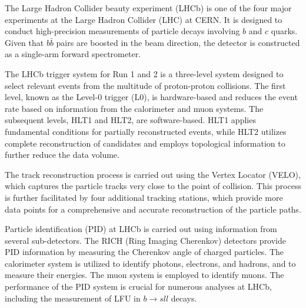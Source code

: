 The Large Hadron Collider beauty experiment (LHCb) is one of the four major experiments 
at the Large Hadron Collider (LHC) at CERN. It is designed to conduct high-precision 
measurements of particle decays involving $b$ and $c$ quarks. Given that $b\bar{b}$ pairs 
are boosted in the beam direction, the detector is constructed as a single-arm forward 
spectrometer. \cite{LHCb}

The LHCb trigger system for Run 1 and 2 is a three-level system designed to select relevant events from 
the multitude of proton-proton collisions. The first level, known as the Level-0 trigger 
(L0), is hardware-based and reduces the event rate based on information from the calorimeter 
and muon systems. The subsequent levels, HLT1 and HLT2, are software-based. HLT1 applies 
fundamental conditions for partially reconstructed events, while HLT2 utilizes complete 
reconstruction of candidates and employs topological information to further reduce the 
data volume. \cite{trigger}

The track reconstruction process is carried out using the Vertex Locator (VELO), which 
captures the particle tracks very close to the point of collision. This process is further 
facilitated by four additional tracking stations, which provide more data points for a 
comprehensive and accurate reconstruction of the particle paths.

Particle identification (PID) at LHCb is carried out using information from several 
sub-detectors. The RICH (Ring Imaging Cherenkov) detectors provide PID information by 
measuring the Cherenkov angle of charged particles. The calorimeter system is utilized 
to identify photons, electrons, and hadrons, and to measure their energies. The muon 
system is employed to identify muons. The performance of the PID system is crucial for 
numerous analyses at LHCb, including the measurement of LFU in $b\to sll$ 
decays. \cite{LHCb}

